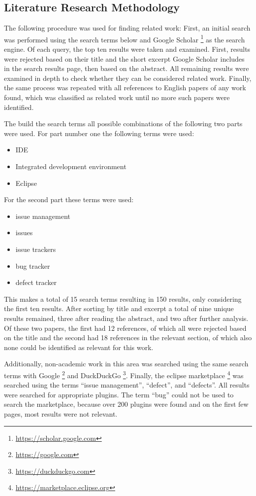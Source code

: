 \subsection{Literature Research Methodology} 
\label{ssec:ch2:ss2.1}
The following procedure was used for finding related work:
First, an initial search was performed using the search terms below and Google Scholar \footnote{\url{https://scholar.google.com}} as the search engine.
Of each query, the top ten results were taken and examined.
First, results were rejected based on their title and the short excerpt Google Scholar includes in the search results page, 
then based on the abstract.
All remaining results were examined in depth to check whether they can be considered related work.
Finally, the same process was repeated with all references to English papers of any work found, 
which was classified as related work until no more such papers were identified.

The build the search terms all possible combinations of the following two parts were used.
For part number one the following terms were used:
\begin{itemize}
	\item IDE
	\item Integrated development environment
	\item Eclipse
\end{itemize}

For the second part these terms were used:

\begin{itemize}
	\item issue management
	\item issues
	\item issue trackers
	\item bug tracker
	\item defect tracker
\end{itemize}

This makes a total of 15 search terms resulting in 150 results, only considering the first ten results.
After sorting by title and excerpt a total of nine unique results remained, three after reading the abstract, and two after further analysis.
Of these two papers, the first had 12 references, of which all were rejected based on the title and the second had 18 references in the relevant section, of which also none could be identified as relevant for this work.

Additionally, non-academic work in this area was searched using the same search terms with Google \footnote{\url{https://google.com}} and DuckDuckGo \footnote{\url{https://duckduckgo.com}}.
Finally, the eclipse marketplace \footnote{\url{https://marketplace.eclipse.org}} was searched using the terms ``issue management'', ``defect'', and ``defects''. 
All results were searched for appropriate plugins.
The term ``bug'' could not be used to search the marketplace, because over 200 plugins were found and on the first few pages, most results were not relevant.

